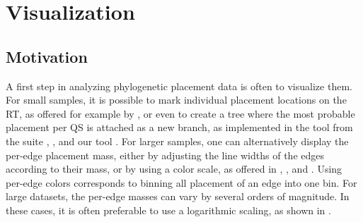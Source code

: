 
\chapter{Visualization}
\label{ch:Visualization}



\section{Motivation}
\label{ch:Visualization:sec:Motivation}

A first step in analyzing phylogenetic placement data is often to visualize them.
For small samples, it is possible to mark individual placement locations on the \ac{RT},
as offered for example by  \cite{Letunic2016},
or even to create a tree where the most probable placement per \ac{QS} is attached as a new branch,
as implemented in the  tool from the  suite \cite{Matsen2010},
 \cite{Berger2011,Stamatakis2014}, and our tool .
For larger samples, one can alternatively display the per-edge placement mass,
either by adjusting the line widths of the edges according to their mass, or by using a color scale,
as offered in  \cite{Yu2017}, , and .
Using per-edge colors corresponds to binning all placement of an edge into one bin.
For large datasets, the per-edge masses can vary by several orders of magnitude.
In these cases, it is often preferable to use a logarithmic scaling, as shown in \cite{Mahe2017}.

